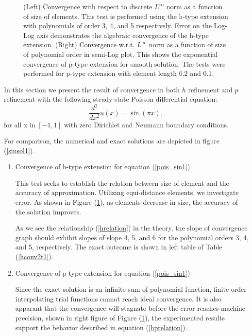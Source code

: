 \begin{figure}[h]
\begin{center}

\caption{\label{sinDNconv1} (Left) Convergence with respect to
discrete $L^{\infty}$ norm as a function of size of elements. This
test is performed using the h-type extension with polynomials of
order 3, 4, and 5 respectively. Error on the Log-Log axis
demonstrates the algebraic convergence of the h-type extension.
(Right) Convergence w.r.t. $L^{\infty}$ norm as a function of size
of polynomial order in semi-Log plot. This shows the exponential
convergence of p-type extension for smooth solution. The tests
were performed for p-type extension with element length $0.2$ and
$0.1$. }
\end{center}
\end{figure}
In this section we present the result of convergence in both $h$
refinement and $p$ refinement with the following steady-state
Poisson differential equation:
\begin{equation}
\label{pois_sin1} \frac{d^2}{dx^2} u(x) = \sin(\pi x),
\end{equation}
for all x in $[-1, 1]$ with zero Dirichlet and Neumann boundary
conditions.


For comparison, the numerical and exact solutions are depicted in
figure (\ref{sinsol1}).

\begin{enumerate}

\item {Convergence of h-type extension for equation (\ref{pois_sin1})}

This test seeks to establish the relation between size of element
and the accuracy of approximation. Utilizing equi-distance
elements, we investigate error. As shown in Figure
(\ref{sinDNconv1}), as elements decrease in size, the accuracy of
the solution improves.

As we see the relationship (\ref{hrelation}) in the theory, the
slope of convergence graph should exhibit slopes of slope 4, 5,
and 6 for the polynomial orders 3, 4, and 5, respectively. The
exact outcome is shown in left table of Table (\ref{hconv2t1}).

\item {Convergence of p-type extension for equation (\ref{pois_sin1})}

Since the exact solution is an infinite sum of polynomial
function, finite order interpolating trial functions cannot reach
ideal convergence. It is also apparant that the convergence will
stagnate before the error reaches machine precision, shown in
right figure of Figure (\ref{sinDNconv1}), the experimented
results support the behavior described in equation
(\ref{hprelation}).

\end{enumerate}

